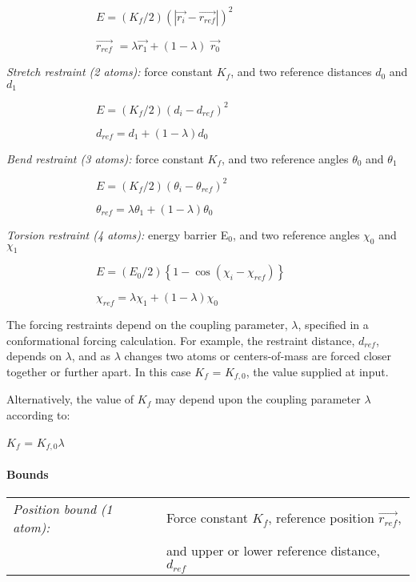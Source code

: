 $\qquad \qquad \qquad \qquad E=\left( K_{f}/2\right) \left( \left| 
\overrightarrow{r_{i}}-\overrightarrow{r_{ref}}\right| \right) ^{2}$

$\qquad \qquad \qquad \qquad \overrightarrow{r_{ref}}$ $=\lambda 
\overrightarrow{r_{1}}+\left( 1-\lambda \right) $ $\overrightarrow{r_{0}}$

{\em Stretch restraint (2 atoms):} force constant $K_{f}$, and two reference
distances $d_{0}$ and $d_{1}$

$\qquad \qquad \qquad \qquad E=\left( K_{f}/2\right) \left(
d_{i}-d_{ref}\right) ^{2}$

$\qquad \qquad \qquad \qquad d_{ref}=d_{1}+\left( 1-\lambda \right) d_{0}$

{\em Bend restraint (3 atoms):} force constant $K_{f}$, and two reference
angles $\theta _{0}$ and $\theta _{1}$

$\qquad \qquad \qquad \qquad E=\left( K_{f}/2\right) \left( \theta
_{i}-\theta _{ref}\right) ^{2}$

$\qquad \qquad \qquad \qquad \theta _{ref}=\lambda \theta _{1}+\left(
1-\lambda \right) \theta _{0}$

{\em Torsion restraint (4 atoms):} energy barrier E$_{0}$, and two reference
angles $\chi _{0}$ and $\chi _{1}$

$\qquad \qquad \qquad \qquad E=\left( E_{0}/2\right) \left\{ 1-\cos \left(
\chi _{i}-\chi _{ref}\right) \right\} $

$\qquad \qquad \qquad \qquad \chi _{ref}=\lambda \chi _{1}+\left( 1-\lambda
\right) \chi _{0}$

The forcing restraints depend on the coupling parameter, $\lambda $,
specified in a conformational forcing calculation. For example, the
restraint distance, $d_{ref}$, depends on $\lambda $, and as $\lambda $
changes two atoms or centers-of-mass are forced closer together or further
apart. In this case $K_{f}$ = $K_{f,0}$, the value supplied at input.

Alternatively, the value of $K_{f}$ may depend upon the coupling parameter $%
\lambda $ according to:

$K_{f}$ = $K_{f,0}$\pagebreak $\lambda $

\paragraph*{Bounds}

\begin{tabular}{ll}
{\em Position bound (1 atom):} & Force constant $K_{f}$, reference position $%
\overrightarrow{r_{ref}}$, \\ 
& and upper or lower reference distance, $d_{ref}$%
\end{tabular}

